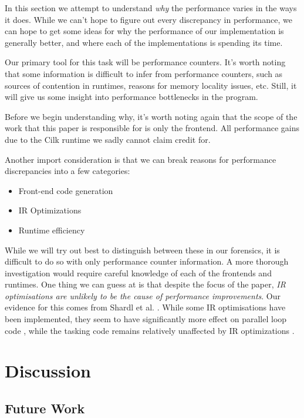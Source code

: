\documentclass[sigconf]{acmart}
\begin{document}
In this section we attempt to understand \emph{why} the performance varies in the ways 
it does. While we can't hope to figure out every discrepancy in performance, we
can hope to get some ideas for why the performance of our implementation is
generally better, and where each of the implementations is spending its time.

Our primary tool for this task will be performance counters. It's worth noting
that some information is difficult to infer from performance counters, such as
sources of contention in runtimes, reasons for memory locality issues, etc.
Still, it will give us some insight into performance bottlenecks in the
program.

Before we begin understanding why, it's worth noting again that the scope of the 
work that this paper is responsible for is only the frontend. All performance
gains due to the Cilk runtime we sadly cannot claim credit for.

Another import consideration is that we can break reasons for performance
discrepancies into a few categories: 

\begin{itemize}
\item Front-end code generation
\item IR Optimizations
\item Runtime efficiency
\end{itemize}

While we will try out best to distinguish between these in our forensics, it is 
difficult to do so with only performance counter information. A more thorough
investigation would require careful knowledge of each of the frontends and
runtimes. One thing we can guess at is that despite the focus of the paper,
\emph{IR optimisations are unlikely to be the cause of performance
improvements}. Our evidence for this comes from Shardl et al. \cite{}. While
some IR optimisations have been implemented, they seem to have significantly
more effect on parallel loop code , while the tasking code remains
relatively unaffected by IR optimizations \cite{}. 

\section{Discussion} \label{Sec:Discussion}

\subsection{Future Work} \label{Sec:Future}
\end{document}
